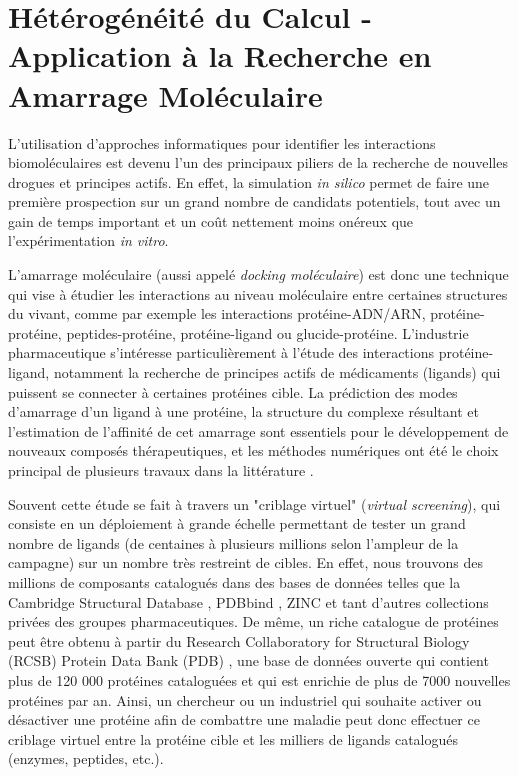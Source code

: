 \section{Hétérogénéité du Calcul - Application à la Recherche en Amarrage Moléculaire} \label{sec:Vasseur}

L'utilisation d'approches informatiques pour identifier les interactions biomoléculaires est devenu l'un des principaux piliers de la recherche de nouvelles drogues et principes actifs. En effet, la simulation \emph{in silico} permet de faire une première prospection sur un grand nombre de candidats potentiels, tout avec un gain de temps important et un coût nettement moins onéreux que l'expérimentation \emph{in vitro}. 

L'amarrage moléculaire (aussi appelé \emph{docking moléculaire}) est donc une technique qui vise à étudier les interactions au niveau moléculaire entre certaines structures du vivant, comme par exemple les interactions protéine-ADN/ARN, protéine-protéine, peptides-protéine, protéine-ligand ou glucide-protéine. L'industrie pharmaceutique s'intéresse particulièrement à l'étude des interactions protéine-ligand, notamment la recherche de principes actifs de médicaments (ligands) qui puissent se connecter à certaines protéines cible. La prédiction des modes d'amarrage d'un ligand à une protéine, la structure du complexe résultant et l'estimation de l'affinité de cet amarrage sont essentiels pour le développement de nouveaux composés thérapeutiques, et les méthodes numériques ont été le choix principal de plusieurs travaux dans la littérature \cite{Abagyan2001,Giganti2010, Klebe2006}.

 Souvent cette étude se fait à travers un "criblage virtuel" (\emph{virtual screening}), qui consiste en un déploiement à grande échelle permettant de tester un grand nombre de ligands (de centaines à plusieurs millions selon l'ampleur de la campagne) sur un nombre très restreint de cibles. En effet, nous trouvons des millions de composants catalogués dans des bases de données telles que la Cambridge Structural Database \cite{Allen2002}, PDBbind  \cite{Wang2004, Wang2005}, ZINC \cite{Irwin2005} et tant d'autres collections privées des groupes pharmaceutiques. De même, un riche catalogue de protéines peut être obtenu à partir du Research Collaboratory for Structural Biology (RCSB) Protein Data Bank (PDB) \cite{PDB}, une base de données ouverte qui contient plus de 120 000 protéines cataloguées et qui est enrichie de plus de 7000 nouvelles protéines par an. Ainsi, un chercheur ou un industriel qui souhaite activer ou désactiver une protéine afin de combattre une maladie peut donc effectuer ce criblage virtuel entre la protéine cible et les milliers de ligands catalogués (enzymes, peptides, etc.).  

